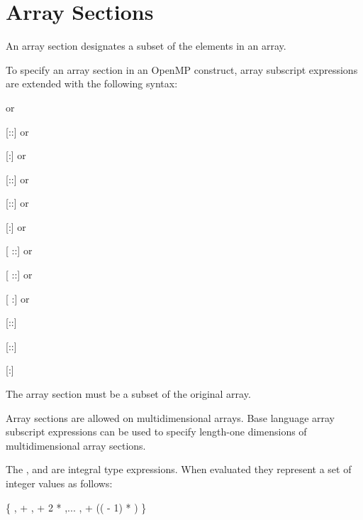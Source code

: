\section{Array Sections}
\label{sec:Array Sections}
An array section designates a subset of the elements in an array.

\begin{ccppspecific}
To specify an array section in an OpenMP construct, array subscript expressions are
extended with the following syntax:
\begin{indentedcodelist}
 \textnormal{or}

[::\plc{ }] \textnormal{or}

[:] \textnormal{or}

[:\plc{ }:] \textnormal{or}

[:\plc{ }:\plc{ }] \textnormal{or}

[:\plc{ }] \textnormal{or}

[ ::] \textnormal{or}

[ ::\plc{ }] \textnormal{or}

[ :] \textnormal{or}

[\plc{ }:\plc{ }:]

[\plc{ }:\plc{ }:\plc{ }]

[\plc{ }:\plc{ }]
\end{indentedcodelist}

The array section must be a subset of the original array.


Array sections are allowed on multidimensional arrays. Base language array subscript
expressions can be used to specify length-one dimensions of multidimensional array
sections.

The ,  and  are integral type 
expressions. When evaluated they represent a set of integer values as follows:

\{ ,  + ,  + 2 * ,... ,  + (( - 1) * ) \}


\end{ccppspecific}
